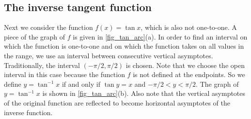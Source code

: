 \subsection{The inverse tangent function}

Next we consider the function $f(x)=\tan x$, which is also not one-to-one. A piece of the graph of $f$ is given in \autoref{fig_tan_arc}(a).  In order to find an interval on which the function is one-to-one and on which the function takes on all values in the range, we use an interval between consecutive vertical asymptotes. Traditionally, the interval $(-\pi/2,\pi/2)$ is chosen. Note that we choose the open interval in this case because the function $f$ is not defined at the endpoints. So we define $y=\tan^{-1} x$ if and only if $\tan y=x$ and $-\pi/2< y<\pi/2$. The graph of $y=\tan^{-1} x$ is shown in \autoref{fig_tan_arc}(b). Also note that the vertical asymptotes of the original function are reflected to become horizontal asymptotes of the inverse function.

